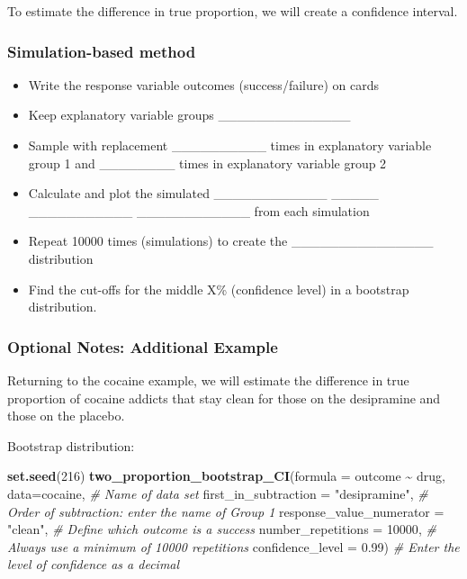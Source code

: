 \documentclass[
]{report}
\newenvironment{Shaded}{\begin{snugshade}}{\end{snugshade}}
\newcommand{\AttributeTok}[1]{\textcolor[rgb]{0.13,0.29,0.53}{#1}}
\newcommand{\CommentTok}[1]{\textcolor[rgb]{0.56,0.35,0.01}{\textit{#1}}}
\newcommand{\DecValTok}[1]{\textcolor[rgb]{0.00,0.00,0.81}{#1}}
\newcommand{\FloatTok}[1]{\textcolor[rgb]{0.00,0.00,0.81}{#1}}
\newcommand{\FunctionTok}[1]{\textcolor[rgb]{0.13,0.29,0.53}{\textbf{#1}}}
\newcommand{\NormalTok}[1]{#1}
\newcommand{\SpecialCharTok}[1]{\textcolor[rgb]{0.81,0.36,0.00}{\textbf{#1}}}
\newcommand{\StringTok}[1]{\textcolor[rgb]{0.31,0.60,0.02}{#1}}
\begin{document}
To estimate the difference in true proportion, we will create a confidence interval.

\subsubsection*{Simulation-based method}\label{simulation-based-method-5}


\begin{itemize}
\item
  Write the response variable outcomes (success/failure) on cards
\item
  Keep explanatory variable groups \_\_\_\_\_\_\_\_\_\_\_\_\_\_
\item
  Sample with replacement \_\_\_\_\_\_\_\_\_\_ times in explanatory variable group 1 and \_\_\_\_\_\_\_\_ times in explanatory variable group 2
\item
  Calculate and plot the simulated \_\_\_\_\_\_\_\_\_\_\_\_ \_\_\_\_\_ \_\_\_\_\_\_\_\_\_\_\_ \_\_\_\_\_\_\_\_\_\_\_\_ from each simulation
\item
  Repeat 10000 times (simulations) to create the \_\_\_\_\_\_\_\_\_\_\_\_\_\_\_ distribution
\item
  Find the cut-offs for the middle X\% (confidence level) in a bootstrap distribution.
\end{itemize}


\subsubsection*{Optional Notes: Additional Example}\label{optional-notes-additional-example-11}

Returning to the cocaine example, we will estimate the difference in true proportion of cocaine addicts that stay clean for those on the desipramine and those on the placebo.

Bootstrap distribution:

\begin{Shaded}
\begin{Highlighting}[]
\FunctionTok{set.seed}\NormalTok{(}\DecValTok{216}\NormalTok{)}
\FunctionTok{two\_proportion\_bootstrap\_CI}\NormalTok{(}\AttributeTok{formula =}\NormalTok{ outcome }\SpecialCharTok{\textasciitilde{}}\NormalTok{ drug, }
        \AttributeTok{data=}\NormalTok{cocaine, }\CommentTok{\# Name of data set}
        \AttributeTok{first\_in\_subtraction =} \StringTok{"desipramine"}\NormalTok{, }\CommentTok{\# Order of subtraction: enter the name of Group 1}
        \AttributeTok{response\_value\_numerator =} \StringTok{"clean"}\NormalTok{, }\CommentTok{\# Define which outcome is a success }
        \AttributeTok{number\_repetitions =} \DecValTok{10000}\NormalTok{, }\CommentTok{\# Always use a minimum of 10000 repetitions}
        \AttributeTok{confidence\_level =} \FloatTok{0.99}\NormalTok{) }\CommentTok{\# Enter the level of confidence as a decimal}
\end{Highlighting}
\end{Shaded}
\end{document}

